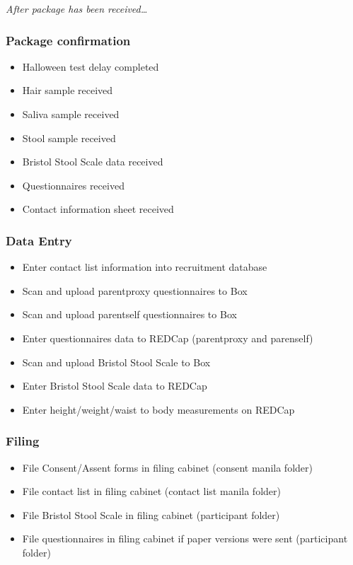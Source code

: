 \documentclass[
]{book}
\providecommand{\tightlist}{%
  \setlength{\itemsep}{0pt}\setlength{\parskip}{0pt}}
\begin{document}
\emph{After package has been received\ldots{}}

\hypertarget{package-confirmation}{%
\subsubsection{Package confirmation}\label{package-confirmation}}

\begin{itemize}
\tightlist
\item
  Halloween test delay completed
\item
  Hair sample received
\item
  Saliva sample received
\item
  Stool sample received
\item
  Bristol Stool Scale data received
\item
  Questionnaires received
\item
  Contact information sheet received
\end{itemize}

\hypertarget{data-entry-2}{%
\subsubsection{Data Entry}\label{data-entry-2}}

\begin{itemize}
\tightlist
\item
  Enter contact list information into recruitment database
\item
  Scan and upload parentproxy questionnaires to Box
\item
  Scan and upload parentself questionnaires to Box
\item
  Enter questionnaires data to REDCap (parentproxy and parenself)
\item
  Scan and upload Bristol Stool Scale to Box
\item
  Enter Bristol Stool Scale data to REDCap
\item
  Enter height/weight/waist to body measurements on REDCap
\end{itemize}

\hypertarget{filing-4}{%
\subsubsection{Filing}\label{filing-4}}

\begin{itemize}
\tightlist
\item
  File Consent/Assent forms in filing cabinet (consent manila folder)
\item
  File contact list in filing cabinet (contact list manila folder)
\item
  File Bristol Stool Scale in filing cabinet (participant folder)
\item
  File questionnaires in filing cabinet if paper versions were sent (participant folder)
\end{itemize}
\end{document}
